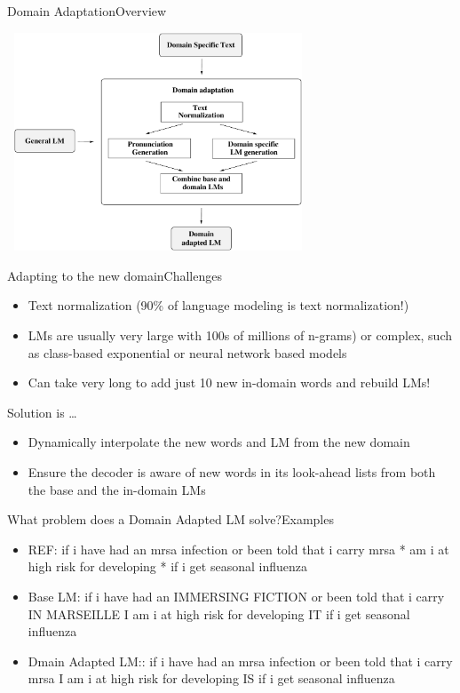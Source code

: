 \begin{frame} {Domain Adaptation}{Overview}
  \begin{center}
    \includegraphics[height=65mm,width=90mm]{figures/DomainAdaptation.pdf}
  \end{center}
\end{frame}


\begin{frame}{Adapting to the new domain}{Challenges}

\begin{itemize}
\item Text normalization (90\% of language modeling is text normalization!)
\item LMs are usually very large with 100s of millions of n-grams) or complex, such as class-based exponential or neural network based models 
\item Can take very long to add just 10 new in-domain words and rebuild LMs! \pause
\end{itemize}
Solution is \ldots
\begin{itemize}
\item  Dynamically interpolate the new words and LM from the new domain
\item  Ensure the decoder is aware of new words in its look-ahead lists from both the base and the in-domain LMs
\end{itemize}

\end{frame}


\begin{frame}{What problem does a Domain Adapted LM solve?}{Examples}

\begin{itemize}
\item {\color{green} REF:  if i have had an {\color{purple} mrsa infection} or been told that i carry {\color{purple} mrsa} *  am i at high risk for developing  *  if i get seasonal influenza}
\item {\color{red} Base LM: if i have had an {\color{purple} IMMERSING FICTION }  or been told that i carry {\color{purple} IN MARSEILLE} I  am i at high risk for developing IT  if i get seasonal influenza}
\item {\color{blue} Dmain Adapted LM::  if i have had an {\color{purple} mrsa infection} or been told that i carry {\color{purple} mrsa} I am i at high risk for developing IS  if i get seasonal influenza }
\end{itemize}
\end{frame}

